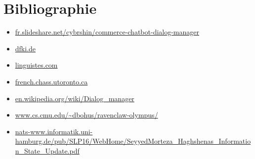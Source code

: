 \documentclass[11pt,dvipsnames,svgnames]{report}
\begin{document}



\newpage

\chapter*{Bibliographie}
\begin{itemize}
	\item \url{fr.slideshare.net/cybrshin/commerce-chatbot-dialog-manager}
	\item \url{dfki.de}
	\item \url{linguistes.com}
	\item \url{french.chass.utoronto.ca}
	\item \url{en.wikipedia.org/wiki/Dialog_manager}
	\item \url{www.cs.cmu.edu/~dbohus/ravenclaw-olympus/}
	\item \url{nats-www.informatik.uni-hamburg.de/pub/SLP16/WebHome/SeyyedMorteza_Haghshenas_Information_State_Update.pdf}
\end{itemize}


\newpage
\listoffigures{}


\end{document}
